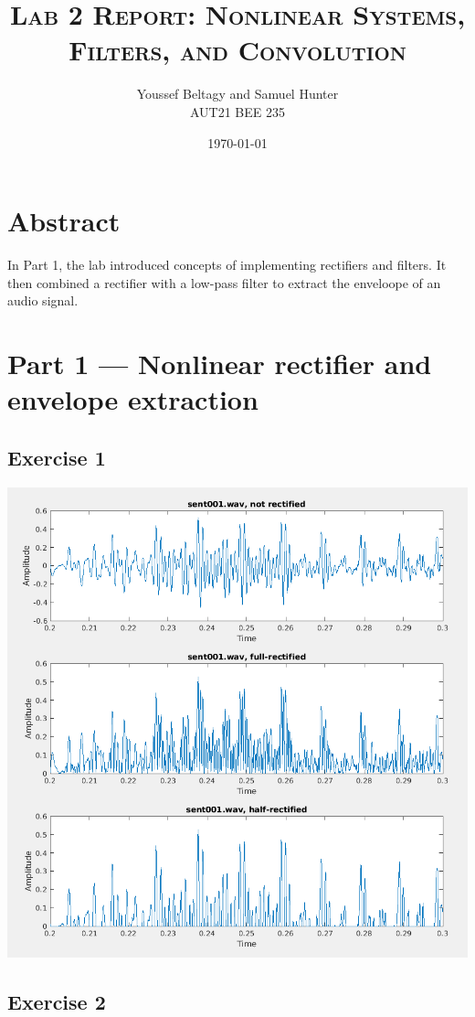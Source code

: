 \documentclass[11pt]{article}
\title{
    \textsc{Lab 2 Report: Nonlinear Systems, Filters, and Convolution}
}
\author{
    \Large{Youssef Beltagy and Samuel Hunter} \\
    \large \textsc{AUT21 BEE 235}
}
\date{\today}
\begin{document}
\maketitle %
\pagebreak


\section{Abstract}

In Part 1, the lab introduced concepts of implementing rectifiers and filters.
It then combined a rectifier with a low-pass filter to extract the enveloope of an audio signal.

\section{Part 1 --- Nonlinear rectifier and envelope extraction}

\subsection{Exercise 1}



\includegraphics[width=\textwidth]{exercise1.png}

\subsection{Exercise 2}
\end{document}
